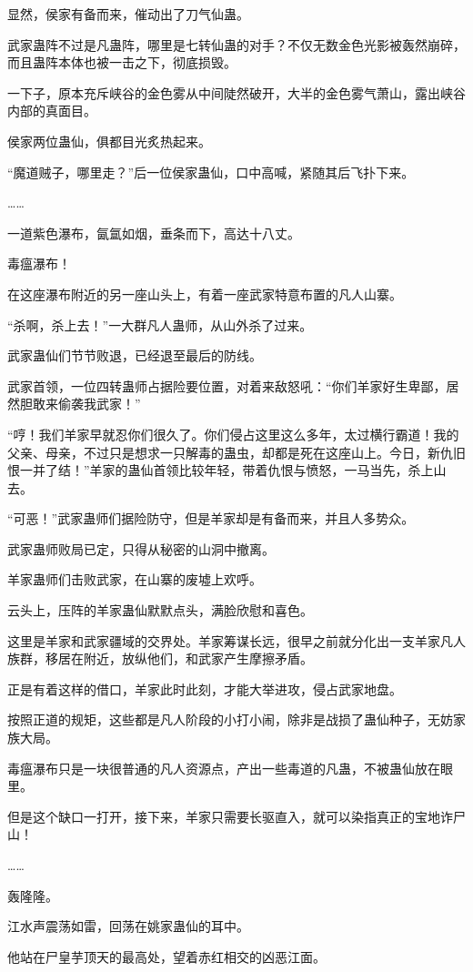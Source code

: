 \begin{this_body}
显然，侯家有备而来，催动出了刀气仙蛊。

武家蛊阵不过是凡蛊阵，哪里是七转仙蛊的对手？不仅无数金色光影被轰然崩碎，而且蛊阵本体也被一击之下，彻底损毁。

一下子，原本充斥峡谷的金色雾从中间陡然破开，大半的金色雾气萧山，露出峡谷内部的真面目。

侯家两位蛊仙，俱都目光炙热起来。

“魔道贼子，哪里走？”后一位侯家蛊仙，口中高喊，紧随其后飞扑下来。

……

一道紫色瀑布，氤氲如烟，垂条而下，高达十八丈。

毒瘟瀑布！

在这座瀑布附近的另一座山头上，有着一座武家特意布置的凡人山寨。

“杀啊，杀上去！”一大群凡人蛊师，从山外杀了过来。

武家蛊仙们节节败退，已经退至最后的防线。

武家首领，一位四转蛊师占据险要位置，对着来敌怒吼：“你们羊家好生卑鄙，居然胆敢来偷袭我武家！”

“哼！我们羊家早就忍你们很久了。你们侵占这里这么多年，太过横行霸道！我的父亲、母亲，不过只是想求一只解毒的蛊虫，却都是死在这座山上。今日，新仇旧恨一并了结！”羊家的蛊仙首领比较年轻，带着仇恨与愤怒，一马当先，杀上山去。

“可恶！”武家蛊师们据险防守，但是羊家却是有备而来，并且人多势众。

武家蛊师败局已定，只得从秘密的山洞中撤离。

羊家蛊师们击败武家，在山寨的废墟上欢呼。

云头上，压阵的羊家蛊仙默默点头，满脸欣慰和喜色。

这里是羊家和武家疆域的交界处。羊家筹谋长远，很早之前就分化出一支羊家凡人族群，移居在附近，放纵他们，和武家产生摩擦矛盾。

正是有着这样的借口，羊家此时此刻，才能大举进攻，侵占武家地盘。

按照正道的规矩，这些都是凡人阶段的小打小闹，除非是战损了蛊仙种子，无妨家族大局。

毒瘟瀑布只是一块很普通的凡人资源点，产出一些毒道的凡蛊，不被蛊仙放在眼里。

但是这个缺口一打开，接下来，羊家只需要长驱直入，就可以染指真正的宝地诈尸山！

……

轰隆隆。

江水声震荡如雷，回荡在姚家蛊仙的耳中。

他站在尸皇芋顶天的最高处，望着赤红相交的凶恶江面。


\end{this_body}
